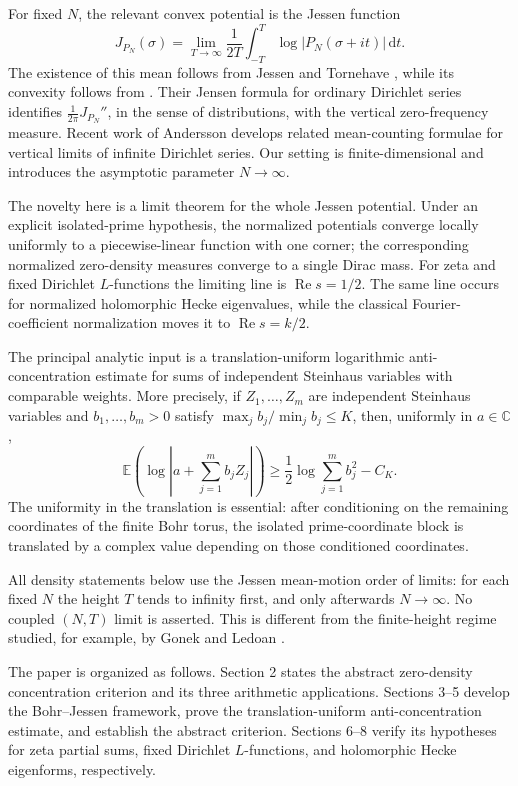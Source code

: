 \documentclass[11pt]{article}
\theoremstyle{definition}
\newcommand{\C}{\mathbb C}
\newcommand{\dd}{\,\mathrm d}
\newcommand{\Ree}{\operatorname{Re}}
\newcommand{\1}{\mathbf 1}
\begin{document}
For fixed $N$, the relevant convex potential is the Jessen function
\begin{equation}\label{eq:Jessen-intro}
J_{P_N}(\sigma)
=
\lim_{T\to\infty}\frac1{2T}
\int_{-T}^{T}\log|P_N(\sigma+it)|\dd t.
\end{equation}
The existence of this mean follows from Jessen and Tornehave \cite[Theorem~5]{JessenTornehave1945}, while its convexity follows from \cite[Theorem~7]{JessenTornehave1945}. Their Jensen formula for ordinary Dirichlet series\cite[Theorem~31]{JessenTornehave1945} identifies $\frac{1}{2\pi}J_{P_N}''$, in the sense of distributions, with the vertical zero-frequency measure. Recent work of Andersson \cite{Andersson2026} develops related mean-counting formulae for vertical limits of
infinite Dirichlet series.  Our setting is finite-dimensional and introduces the asymptotic parameter $N\to\infty$.

The novelty here is a limit theorem for the whole Jessen potential.  Under an explicit isolated-prime hypothesis, the normalized potentials converge locally uniformly to a piecewise-linear function with one corner; the corresponding normalized zero-density measures converge to a single Dirac mass.  For zeta and fixed Dirichlet $L$-functions the limiting line is $\Ree s=1/2$.  The same line occurs for normalized holomorphic Hecke eigenvalues, while the classical Fourier-coefficient normalization moves it to $\Ree s=k/2$.

The principal analytic input is a translation-uniform logarithmic anti-concentration estimate for sums of independent Steinhaus variables with comparable weights.  More precisely, if $Z_1,\ldots,Z_m$ are independent Steinhaus variables and $b_1,\ldots,b_m>0$ satisfy $\max_j b_j/\min_j b_j\le K$, then, uniformly in $a\in\C$,
\[
\mathbb E\left(\log\left|a+\sum_{j=1}^m b_jZ_j\right|\right)
\ge
\frac12\log\sum_{j=1}^m b_j^2-C_K.
\]
The uniformity in the translation is essential: after conditioning on the remaining coordinates of the finite Bohr torus, the isolated prime-coordinate block is translated by a complex value depending on those conditioned coordinates.

All density statements below use the Jessen mean-motion order of limits: for each fixed $N$ the height $T$ tends to infinity first, and only afterwards $N\to\infty$.  No coupled $(N,T)$ limit is asserted.  This is different from the finite-height regime studied, for example, by Gonek and Ledoan \cite{GonekLedoan2010}.

The paper is organized as follows. Section 2 states the abstract zero-density concentration criterion and its three arithmetic applications. Sections 3–5 develop the Bohr–Jessen framework, prove the translation-uniform anti-concentration estimate, and establish the abstract criterion. Sections 6–8 verify its hypotheses for zeta partial sums, fixed Dirichlet \(L\)-functions, and holomorphic Hecke eigenforms, respectively.
\end{document}
